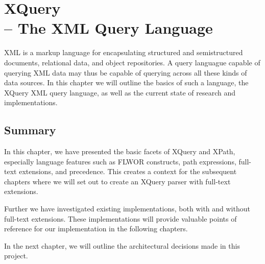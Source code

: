 \chapter[XQuery -- The XML Query Language]{XQuery \\ \huge-- The XML Query Language}
\label{chapter:theory}
XML is a markup language for encapsulating structured and semistructured
documents, relational data, and object repositories. A query languague capable
of querying XML data may thus be capable of querying across all these kinds of
data sources. In this chapter we will outline the basics of such a language, 
the XQuery XML query language, as well as the current state of research and
implementations. 




\section{Summary}
In this chapter, we have presented the basic facets of XQuery and XPath,
especially language features such as FLWOR constructs, path expressions, 
full-text extensions, and precedence. This creates a context for the subsequent
chapters where we will set out to create an XQuery parser with full-text
extensions. 

Further we have investigated existing implementations, both with and without
full-text extensions. These implementations will provide valuable points of
reference for our implementation in the following chapters.

In the next chapter, we will outline the architectural decisions made in this
project.